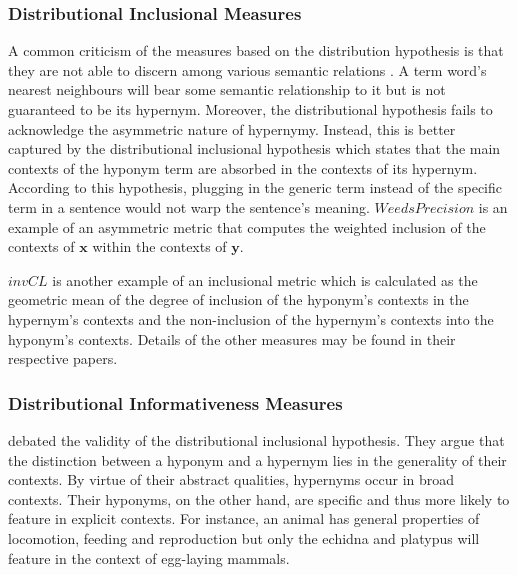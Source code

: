 \subsubsection{Distributional Inclusional Measures}
A common criticism of the measures based on the distribution hypothesis is that they are not able to discern among various semantic relations \citep{roller2014inclusive}.  A term word’s nearest neighbours will bear some semantic relationship to it but is not guaranteed to be its hypernym. Moreover, the distributional hypothesis fails to acknowledge the asymmetric nature of hypernymy.  Instead, this is better captured by the distributional inclusional hypothesis \citep{geffet2005distributional} which states that the main contexts of the hyponym term are absorbed in the contexts of its hypernym.  According to this hypothesis, plugging in the generic term instead of the specific term in a sentence would not warp the sentence’s meaning.  $Weeds Precision$ \citep{weeds2003general} is an example of an asymmetric metric that computes the weighted inclusion of the contexts of $\textbf{x}$ within the contexts of $\textbf{y}$.  

$invCL$ \citep{lenci2012identifying} is another example of an inclusional metric which is calculated as the geometric mean of the degree of inclusion of the hyponym’s contexts in the hypernym’s contexts  and the non-inclusion of the hypernym’s contexts into the hyponym’s contexts.  Details of the other measures may be found in their respective papers.


\subsubsection{Distributional Informativeness Measures}
\citeauthor{santus2014chasing} debated the validity of the distributional inclusional hypothesis.  They argue that the distinction between a hyponym and a hypernym lies in the generality of their contexts.  By virtue of their abstract qualities, hypernyms occur in broad contexts.  Their hyponyms, on the other hand, are specific and thus more likely to feature in explicit contexts.  For instance, an animal has general properties of locomotion, feeding and reproduction but only the echidna and platypus will feature in the context of egg-laying mammals.

